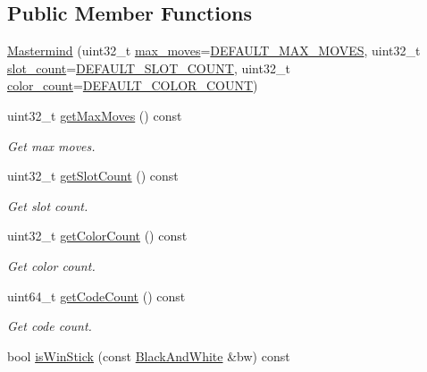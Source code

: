 \subsection*{Public Member Functions}
\begin{DoxyCompactItemize}
\item 
\hyperlink{classmastermind_1_1logic_1_1_mastermind_a386b9f51c21ab36c651f86d1671eccfd}{Mastermind} (uint32\+\_\+t \hyperlink{classmastermind_1_1logic_1_1_mastermind_ac25c65d6c3b258154b632e5edb77fdb7}{max\+\_\+moves}=\hyperlink{classmastermind_1_1logic_1_1_mastermind_a1b389e8f4829939f8fd49e093cb9868b}{D\+E\+F\+A\+U\+L\+T\+\_\+\+M\+A\+X\+\_\+\+M\+O\+V\+ES}, uint32\+\_\+t \hyperlink{classmastermind_1_1logic_1_1_mastermind_a19f901a04d6175f6437b89cd3600c338}{slot\+\_\+count}=\hyperlink{classmastermind_1_1logic_1_1_mastermind_a27d7dbfa1b75744f4b8378e7faaec0af}{D\+E\+F\+A\+U\+L\+T\+\_\+\+S\+L\+O\+T\+\_\+\+C\+O\+U\+NT}, uint32\+\_\+t \hyperlink{classmastermind_1_1logic_1_1_mastermind_a6fe199e91d3e00de452087f0aedabeff}{color\+\_\+count}=\hyperlink{classmastermind_1_1logic_1_1_mastermind_a090907ffd34339289c533fada5bd05c6}{D\+E\+F\+A\+U\+L\+T\+\_\+\+C\+O\+L\+O\+R\+\_\+\+C\+O\+U\+NT})
\item 
uint32\+\_\+t \hyperlink{classmastermind_1_1logic_1_1_mastermind_a7d74266aa973efd0fd9b0cf238c4080f}{get\+Max\+Moves} () const
\begin{DoxyCompactList}\small\item\em Get max moves. \end{DoxyCompactList}\item 
uint32\+\_\+t \hyperlink{classmastermind_1_1logic_1_1_mastermind_a81d6b51ea24fa52073d87d250d7268ff}{get\+Slot\+Count} () const
\begin{DoxyCompactList}\small\item\em Get slot count. \end{DoxyCompactList}\item 
uint32\+\_\+t \hyperlink{classmastermind_1_1logic_1_1_mastermind_ab24668a2fa062cd89a4bd3878b8beef8}{get\+Color\+Count} () const
\begin{DoxyCompactList}\small\item\em Get color count. \end{DoxyCompactList}\item 
uint64\+\_\+t \hyperlink{classmastermind_1_1logic_1_1_mastermind_a75472536b4800a58cfcc47cbe07b02cf}{get\+Code\+Count} () const
\begin{DoxyCompactList}\small\item\em Get code count. \end{DoxyCompactList}\item 
bool \hyperlink{classmastermind_1_1logic_1_1_mastermind_a97247d26b2896c78711cef22611a009b}{is\+Win\+Stick} (const \hyperlink{classmastermind_1_1logic_1_1_black_and_white}{Black\+And\+White} \&bw) const
\end{DoxyCompactItemize}
